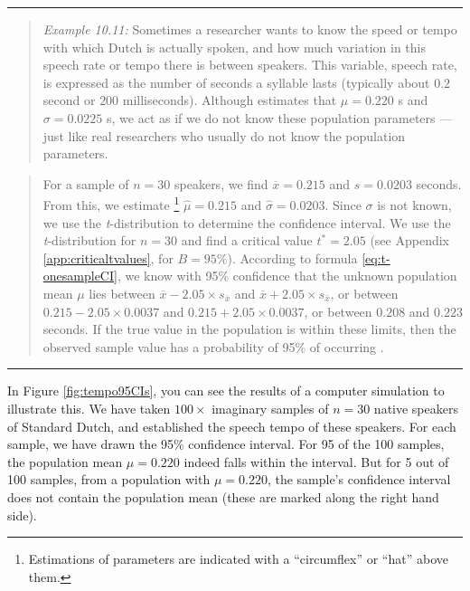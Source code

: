 \documentclass[
]{book}
\begin{document}
\begin{center}\rule{0.5\linewidth}{0.5pt}\end{center}

\begin{quote}
\emph{Example 10.11:}
Sometimes a researcher wants to know the speed or tempo with which Dutch is actually spoken,
and how much variation in this speech rate or tempo there is between speakers.
This variable, speech rate, is expressed as the number of seconds
a syllable lasts (typically about \(0.2\) second or \(200\) milliseconds). Although \citet{Quene08}
estimates that \(\mu=0.220\) s and \(\sigma=0.0225\) s, we act as if
we do not know these population parameters --- just like real
researchers who usually do not know
the population parameters.
\end{quote}

\begin{quote}
For a sample of \(n=30\) speakers, we find \(\overline{x}=0.215\)
and
\(s=0.0203\) seconds. From this, we estimate \footnote{Estimations of parameters are indicated with a ``circumflex'' or ``hat'' above them.}
\(\hat{\mu}=0.215\) and
\(\hat{\sigma}=0.0203\). Since \(\sigma\) is not known, we use
the \emph{t}-distribution to determine the confidence interval. We
use the \emph{t}-distribution for \(n=30\) and find a critical value
\(t^*=2.05\) (see Appendix \ref{app:criticaltvalues}, for \(B=95\)\%).
According to formula \eqref{eq:t-onesampleCI}, we know with 95\%
confidence that the unknown population mean \(\mu\) lies
between \(\overline{x}-2.05\times s_{\bar{x}}\) and \(\overline{x}+2.05\times s_{\bar{x}}\),
or between \(0.215-2.05\times0.0037\) and
\(0.215+2.05\times0.0037\),
or between \(0.208\) and \(0.223\) seconds.
If the true value in the population is within these limits, then the observed sample value has a probability of 95\% of occurring \citep[p.241]{Spie19}.
\end{quote}

\begin{center}\rule{0.5\linewidth}{0.5pt}\end{center}

In Figure \ref{fig:tempo95CIs}, you can see the results of a
computer simulation to illustrate this. We have taken \(100\times\)
imaginary samples of \(n=30\) native speakers of Standard Dutch, and established the
speech tempo of these speakers. For each sample, we have drawn
the 95\% confidence interval. For 95 of the 100 samples, the population
mean \(\mu=0.220\) indeed falls within the interval.
But for 5 out of 100 samples, from a population with \(\mu=0.220\), the sample's confidence interval does not contain the population mean (these are marked along the right hand side).
\end{document}

